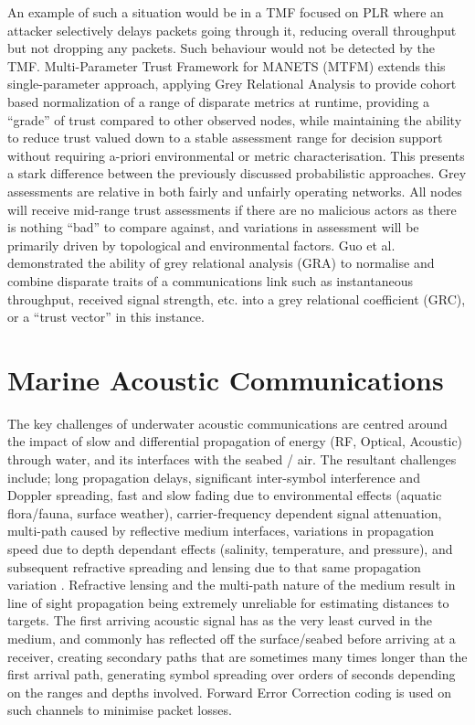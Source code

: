 An example of such a situation would be in a TMF focused on PLR where an attacker selectively delays packets going through it, reducing overall throughput but not dropping any packets. Such behaviour would not be detected by the TMF.
Multi-Parameter Trust Framework for MANETS (MTFM) extends this single-parameter approach, applying Grey Relational Analysis \cite{Zuo1995} to provide cohort based normalization of a range of disparate metrics at runtime, providing a “grade” of trust compared to other observed nodes, while maintaining the ability to reduce trust valued down to a stable assessment range for decision support without requiring a-priori environmental or metric characterisation. This presents a stark difference between the previously discussed probabilistic approaches. Grey assessments are relative in both fairly and unfairly operating networks. All nodes will receive mid-range trust assessments if there are no malicious actors as there is nothing ``bad'' to compare against, and variations in assessment will be primarily driven by topological and environmental factors.
Guo et al. \cite{Guo11} demonstrated the ability of grey relational analysis (GRA) \cite{Zuo1995} to normalise and combine disparate traits of a communications link such as instantaneous throughput, received signal strength, etc. into a grey relational coefficient (GRC), or a ``trust vector'' in this instance.


\section{Marine Acoustic Communications}

The key challenges of underwater acoustic communications are centred around the impact of slow and differential propagation of energy (RF, Optical, Acoustic) through water, and its interfaces with the seabed / air.
The resultant challenges include; long propagation delays, significant inter-symbol interference and Doppler spreading, fast and slow fading due to environmental effects (aquatic flora/fauna, surface weather), carrier-frequency dependent signal attenuation, multi-path caused by reflective medium interfaces, variations in propagation speed due to depth dependant effects (salinity, temperature, and pressure), and subsequent refractive spreading and lensing due to that same propagation variation \cite{Partan2006}.
Refractive lensing and the multi-path nature of the medium result in line of sight propagation being extremely unreliable for estimating distances to targets.
The first arriving acoustic signal has as the very least curved in the medium, and commonly has reflected off the surface/seabed before arriving at a receiver, creating secondary paths that are sometimes many times longer than the first arrival path, generating symbol spreading over orders of seconds depending on the ranges and depths involved.
Forward Error Correction coding is used on such channels to minimise packet losses.

